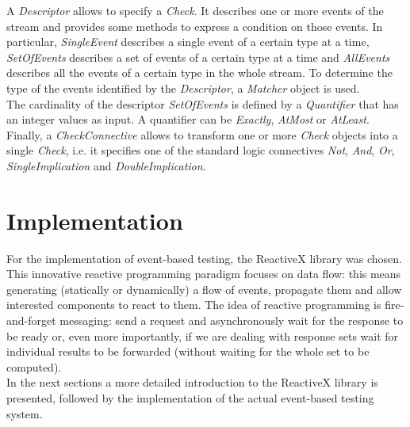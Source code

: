 \documentclass[11pt,a4paper,notitlepage]{article}
\begin{document}
A \textit{Descriptor} allows to specify a \textit{Check}. It describes one or more events of the stream and provides some methods to express a condition on those events. In particular, \textit{SingleEvent} describes a single event of a certain type at a time, \textit{SetOfEvents} describes a set of events of a certain type at a time and \textit{AllEvents} describes all the events of a certain type in the whole stream. To determine the type of the events identified by the \textit{Descriptor}, a \textit{Matcher} object is used.\medskip \\
The cardinality of the descriptor \textit{SetOfEvents} is defined by a \textit{Quantifier} that has an integer values as input. A quantifier can be \textit{Exactly}, \textit{AtMost} or \textit{AtLeast}.\medskip \\
Finally, a \textit{CheckConnective} allows to transform one or more \textit{Check} objects into a single \textit{Check}, i.e. it specifies one of the standard logic connectives \textit{Not}, \textit{And}, \textit{Or}, \textit{SingleImplication} and \textit{DoubleImplication}.

\section{Implementation}

For the implementation of event-based testing, the ReactiveX library was chosen. This innovative reactive programming paradigm focuses on data flow: this means generating (statically or dynamically) a flow of events, propagate them and allow interested components to react to them. The idea of reactive programming is fire-and-forget messaging: send a request and asynchronously wait for the response to be ready or, even more importantly, if we are dealing with response sets wait for individual results to be forwarded (without waiting for the whole set to be computed).\bigskip \\
In the next sections a more detailed introduction to the ReactiveX library is presented, followed by the implementation of the actual event-based testing system.
\end{document}
